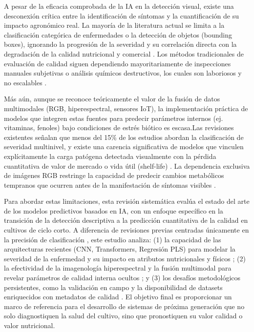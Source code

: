 \documentclass[agriculture,article,submit,pdftex,moreauthors]{Definitions/mdpi}
\begin{document}
A pesar de la eficacia comprobada de la IA en la detección visual, existe una desconexión crítica entre la identificación de síntomas y la cuantificación de su impacto agronómico real. La mayoría de la literatura actual se limita a la clasificación categórica de enfermedades o la detección de objetos (bounding boxes), ignorando la progresión de la severidad y su correlación directa con la degradación de la calidad nutricional y comercial \citep{Zaludin2025}. Los métodos tradicionales de evaluación de calidad siguen dependiendo mayoritariamente de inspecciones manuales subjetivas o análisis químicos destructivos, los cuales son laboriosos y no escalables \citep{Yang2025,Zhang2025}.

Más aún, aunque se reconoce teóricamente el valor de la fusión de datos multimodales (RGB, hiperespectral, sensores IoT), la implementación práctica de modelos que integren estas fuentes para predecir parámetros internos (ej. vitaminas, fenoles) bajo condiciones de estrés biótico es escasa.Las revisiones existentes señalan que menos del 15\% de los estudios abordan la clasificación de severidad multinivel, y existe una carencia significativa de modelos que vinculen explícitamente la carga patógena detectada visualmente con la pérdida cuantitativa de valor de mercado o vida útil (shelf-life) \citep{Zhang2025,Safari2024}. La dependencia exclusiva de imágenes RGB restringe la capacidad de predecir cambios metabólicos tempranos que ocurren antes de la manifestación de síntomas visibles \citep{Szechynska-Hebda2025}.

Para abordar estas limitaciones, esta revisión sistemática evalúa el estado del arte de los modelos predictivos basados en IA, con un enfoque específico en la transición de la detección descriptiva a la predicción cuantitativa de la calidad en cultivos de ciclo corto. A diferencia de revisiones previas centradas únicamente en la precisión de clasificación \citep{Raut2024,Sharma2024}, este estudio analiza: (1) la capacidad de las arquitecturas recientes (CNN, Transformers, Regresión PLS) para modelar la severidad de la enfermedad y su impacto en atributos nutricionales y físicos \citep{Szechynska-Hebda2025, Joshi2025}; (2) la efectividad de la imagenología hiperespectral y la fusión multimodal para revelar parámetros de calidad interna ocultos \citep{Zhang2025}; y (3) los desafíos metodológicos persistentes, como la validación en campo y la disponibilidad de datasets enriquecidos con metadatos de calidad \citep{Yang2025}. El objetivo final es proporcionar un marco de referencia para el desarrollo de sistemas de próxima generación que no solo diagnostiquen la salud del cultivo, sino que pronostiquen su valor calidad o valor nutricional.
\end{document}
